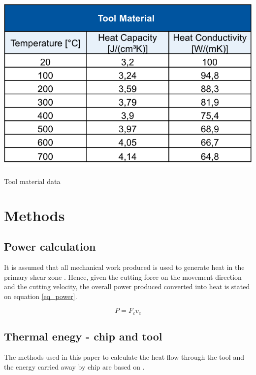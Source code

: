 		\begin{table}[h]
			\centering
			\captionsetup{justification=centering}
			\includegraphics[scale = 0.6]{Imagens/dataTool.png}
			\caption{Tool material data \cite{augspurger2016experimental}}
			\label{tab:dataT}
		\end{table}

	\section{Methods}
	\label{methods}
	
		\subsection{Power calculation}
			It is assumed that all mechanical work produced is used to generate heat in the primary shear zone \cite{abukhshim2006heat}. Hence, given the cutting force on the movement direction and the cutting velocity, the overall power produced converted into heat is stated on equation \ref{eq_power}.

			\begin{equation} 
			\label{eq_power}
				P = F_{c}v_{c}
			\end{equation}
		
		\subsection{Thermal enegy - chip and tool}
			The methods used in this paper to calculate the heat flow through the tool and the energy carried away by chip are based on \cite{boothroyd1963temperatures}.

